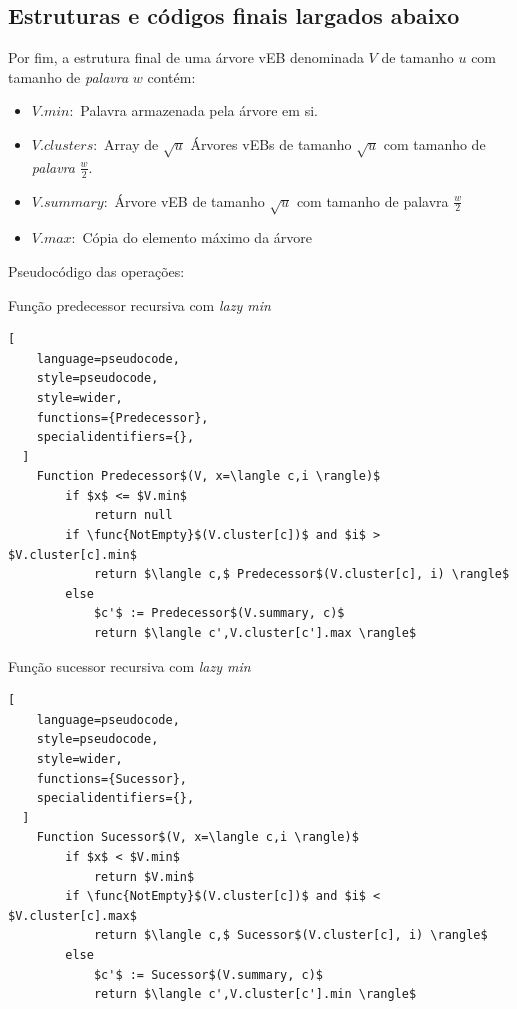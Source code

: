 \subsection{Estruturas e códigos finais largados abaixo}

Por fim, a estrutura final de uma árvore vEB denominada $V$ de tamanho $u$ com
tamanho de \textit{palavra} $w$ contém:
\begin{itemize}
\item $V.min:$ Palavra armazenada pela árvore em si.
\item $V.clusters:$ Array de $\sqrt u$ Árvores vEBs de tamanho $\sqrt u$ com
tamanho de \textit{palavra} $\frac{w}{2}$. 
\item $V.summary:$ Árvore vEB de tamanho $\sqrt{u}$ com tamanho de palavra
$\frac{w}{2}$
\item $V.max:$ Cópia do elemento máximo da árvore
\end{itemize}

Pseudocódigo das operações:

\begin{programruledcaption}{Função predecessor recursiva com \emph{lazy min} \label{p:veb-final-predecessor-1}}
  \begin{lstlisting}[
    language=pseudocode,
    style=pseudocode,
    style=wider,
    functions={Predecessor},
    specialidentifiers={},
  ]
    Function Predecessor$(V, x=\langle c,i \rangle)$
        if $x$ <= $V.min$
            return null
        if \func{NotEmpty}$(V.cluster[c])$ and $i$ > $V.cluster[c].min$
            return $\langle c,$ Predecessor$(V.cluster[c], i) \rangle$
        else
            $c'$ := Predecessor$(V.summary, c)$
            return $\langle c',V.cluster[c'].max \rangle$
  \end{lstlisting}
\end{programruledcaption}

\begin{programruledcaption}{Função sucessor recursiva com \emph{lazy min} \label{p:veb-final-successor-1}}
  \begin{lstlisting}[
    language=pseudocode,
    style=pseudocode,
    style=wider,
    functions={Sucessor},
    specialidentifiers={},
  ]
    Function Sucessor$(V, x=\langle c,i \rangle)$
        if $x$ < $V.min$
            return $V.min$
        if \func{NotEmpty}$(V.cluster[c])$ and $i$ < $V.cluster[c].max$
            return $\langle c,$ Sucessor$(V.cluster[c], i) \rangle$
        else
            $c'$ := Sucessor$(V.summary, c)$
            return $\langle c',V.cluster[c'].min \rangle$
  \end{lstlisting}
\end{programruledcaption}

